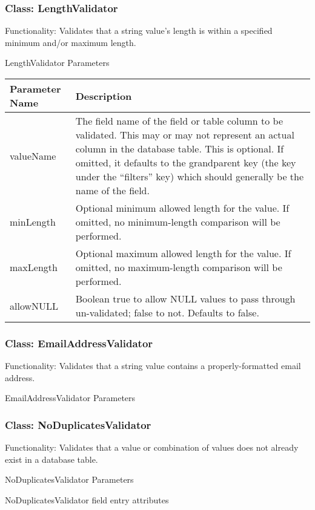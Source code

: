\documentclass[letterpaper,10pt,english]{sphinxmanual}
\begin{document}
\subsubsection{Class: LengthValidator}
\label{jaxFrameworkGuide:class-lengthvalidator}
Functionality: Validates that a string value's length is within a specified minimum and/or maximum
length.

LengthValidator Parameters

\begin{tabulary}{\linewidth}{|L|L|}
\hline
\textsf{\relax 
Parameter Name
} & \textsf{\relax 
Description
}\\
\hline
valueName
 & 
The field name of the field or table column to be validated.  This may or may not
represent an actual column in the database table.  This is optional.  If omitted, it
defaults to the grandparent key (the key under the ``filters'' key) which should
generally be the name of the field.
\\
\hline
minLength
 & 
Optional minimum allowed length for the value.  If omitted, no minimum-length
comparison will be performed.
\\
\hline
maxLength
 & 
Optional maximum allowed length for the value.  If omitted, no maximum-length
comparison will be performed.
\\
\hline
allowNULL
 & 
Boolean true to allow NULL values to pass through un-validated; false to not.
Defaults to false.
\\
\hline\end{tabulary}



\subsubsection{Class: EmailAddressValidator}
\label{jaxFrameworkGuide:class-emailaddressvalidator}
Functionality: Validates that a string value contains a properly-formatted email address.

EmailAddressValidator Parameters


\subsubsection{Class: NoDuplicatesValidator}
\label{jaxFrameworkGuide:class-noduplicatesvalidator}
Functionality: Validates that a value or combination of values does not already exist in a database
table.

NoDuplicatesValidator Parameters

NoDuplicatesValidator field entry attributes
\end{document}
